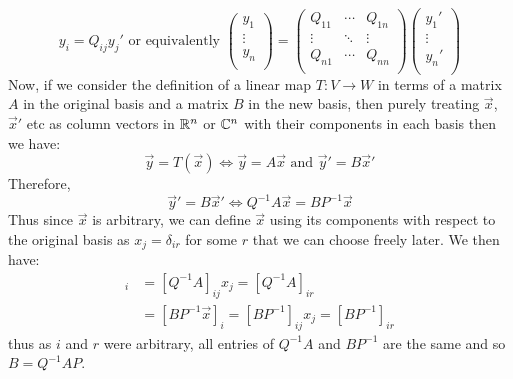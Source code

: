 \documentclass[../main.tex]{subfiles}
\begin{document}
\[
  y_i = Q_{i j}y_j' \text{ or equivalently }
  \begin{pmatrix}
  y_1 \\
  \vdots \\
  y_n \\
  \end{pmatrix} =
  \begin{pmatrix}
  Q_{1 1} & \cdots & Q_{1 n} \\
  \vdots & \ddots & \vdots \\
  Q_{n 1} & \cdots & Q_{n n} \\
  \end{pmatrix}
  \begin{pmatrix}
  y_1' \\
  \vdots \\
  y_n' \\
  \end{pmatrix}
\]
Now, if we consider the definition of a linear map $T: V \to W$ in terms of a matrix $A$ in the original basis and a matrix $B$ in the new basis, then purely treating $\vec{x}$, $\vec{x}'$ etc as column vectors in $\mathbb{R}^{n}$ or $\mathbb{C}^{n}$ with their components in each basis then we have:
\[
  \vec{y} = T(\vec{x}) \iff \vec{y} = A\vec{x} \text{ and } \vec{y}' = B\vec{x}'
\]
Therefore,
\[
  \vec{y}' = B\vec{x}' \iff Q^{-1}A \vec{x} = BP^{-1} \vec{x}
\]
Thus since $\vec{x}$ is arbitrary, we can define $\vec{x}$ using its components with respect to the original basis as $x_j = \delta_{i r}$ for some $r$ that we can choose freely later.
We then have:
\begin{align*}
  [Q^{-1}A \vec{x}]_i &= [Q^{-1} A]_{i j} x_j = [Q^{-1} A]_{i r} \\
                      &= [BP^{-1} \vec{x}]_i = [BP^{-1}]_{i j} x_j = [BP^{-1}]_{i r}
\end{align*}
thus as $i$ and $r$ were arbitrary, all entries of $Q^{-1} A$ and $BP^{-1}$ are the same and so $B = Q^{-1} A P$.
\end{document}
